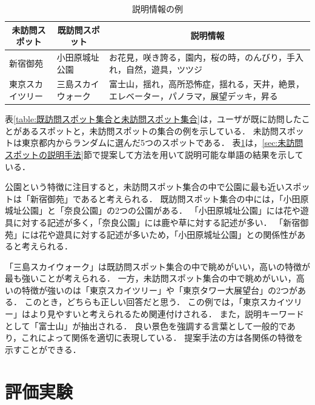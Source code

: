 \documentclass{deimj}
\begin{document}
\begin{table}[t]
  \caption{説明情報の例}
  \label{table:説明情報の例}
  \centering
  \begin{tabular}{l|l|l}
  \hline
  \multicolumn{1}{c|}{未訪問スポット} & \multicolumn{1}{c|}{既訪問スポット} & \multicolumn{1}{c}{説明情報}                     \\ \hline
  新宿御苑                      & 小田原城址公園                         & お花見，咲き誇る，園内，桜の時，のんびり，手入れ，自然，遊具，ツツジ          \\
  東京スカイツリー                     & 三島スカイウォーク                    & 富士山，揺れ，高所恐怖症，揺れる，天井，絶景，エレベーター，パノラマ，展望デッキ，昇る \\ \hline
  \end{tabular}
\end{table}

表\ref{table:既訪問スポット集合と未訪問スポット集合}は，ユーザが既に訪問したことがあるスポットと，未訪問スポットの集合の例を示している．
未訪問スポットは東京都内からランダムに選んだ5つのスポットである．
表\ref{table:説明情報の例}は，\ref{sec:未訪問スポットの説明手法}節で提案して方法を用いて説明可能な単語の結果を示している．

公園という特徴に注目すると，未訪問スポット集合の中で公園に最も近いスポットは「新宿御苑」であると考えられる．
既訪問スポット集合の中には，「小田原城址公園」と「奈良公園」の2つの公園がある．
「小田原城址公園」には花や遊具に対する記述が多く，「奈良公園」には鹿や草に対する記述が多い．
「新宿御苑」には花や遊具に対する記述が多いため，「小田原城址公園」との関係性があると考えられる．

「三島スカイウォーク」は既訪問スポット集合の中で眺めがいい，高いの特徴が最も強いことが考えられる．
一方，未訪問スポット集合の中で眺めがいい，高いの特徴が強いのは「東京スカイツリー」や「東京タワー大展望台」の2つがある．
このとき，どちらも正しい回答だと思う．
この例では，「東京スカイツリー」はより見やすいと考えられるため関連付けされる．
また，説明キーワードとして「富士山」が抽出される．
良い景色を強調する言葉として一般的であり，これによって関係を適切に表現している．
提案手法の方は各関係の特徴を示すことができる．

\section{評価実験}
\label{sec:評価実験}
\end{document}
